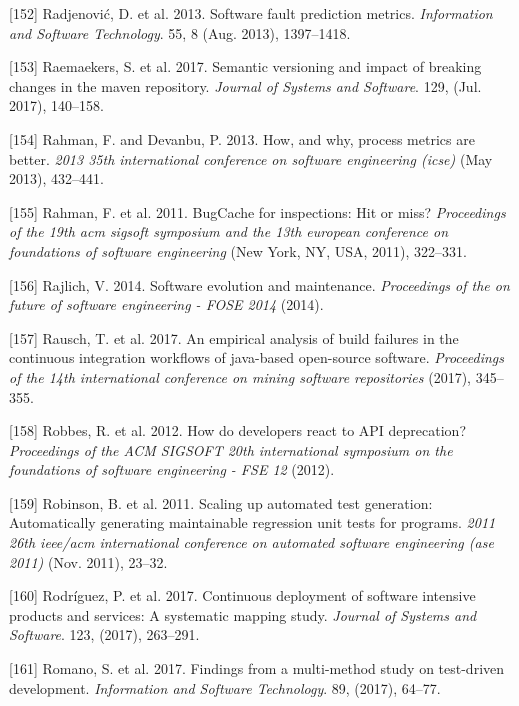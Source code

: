 \documentclass[]{book}
\begin{document}
\hypertarget{ref-Radjenovic2013}{}
{[}152{]} Radjenović, D. et al. 2013. Software fault prediction metrics.
\emph{Information and Software Technology}. 55, 8 (Aug. 2013),
1397--1418.

\hypertarget{ref-Raemaekers2017}{}
{[}153{]} Raemaekers, S. et al. 2017. Semantic versioning and impact of
breaking changes in the maven repository. \emph{Journal of Systems and
Software}. 129, (Jul. 2017), 140--158.

\hypertarget{ref-Rahman2013}{}
{[}154{]} Rahman, F. and Devanbu, P. 2013. How, and why, process metrics
are better. \emph{2013 35th international conference on software
engineering (icse)} (May 2013), 432--441.

\hypertarget{ref-rahman2011}{}
{[}155{]} Rahman, F. et al. 2011. BugCache for inspections: Hit or miss?
\emph{Proceedings of the 19th acm sigsoft symposium and the 13th
european conference on foundations of software engineering} (New York,
NY, USA, 2011), 322--331.

\hypertarget{ref-Rajlich2014}{}
{[}156{]} Rajlich, V. 2014. Software evolution and maintenance.
\emph{Proceedings of the on future of software engineering - FOSE 2014}
(2014).

\hypertarget{ref-rausch2017empirical}{}
{[}157{]} Rausch, T. et al. 2017. An empirical analysis of build
failures in the continuous integration workflows of java-based
open-source software. \emph{Proceedings of the 14th international
conference on mining software repositories} (2017), 345--355.

\hypertarget{ref-Robbes2012}{}
{[}158{]} Robbes, R. et al. 2012. How do developers react to API
deprecation? \emph{Proceedings of the ACM SIGSOFT 20th international
symposium on the foundations of software engineering - FSE 12} (2012).

\hypertarget{ref-robinson2011}{}
{[}159{]} Robinson, B. et al. 2011. Scaling up automated test
generation: Automatically generating maintainable regression unit tests
for programs. \emph{2011 26th ieee/acm international conference on
automated software engineering (ase 2011)} (Nov. 2011), 23--32.

\hypertarget{ref-rodriguez2017a}{}
{[}160{]} Rodríguez, P. et al. 2017. Continuous deployment of software
intensive products and services: A systematic mapping study.
\emph{Journal of Systems and Software}. 123, (2017), 263--291.

\hypertarget{ref-ROMANO201764}{}
{[}161{]} Romano, S. et al. 2017. Findings from a multi-method study on
test-driven development. \emph{Information and Software Technology}. 89,
(2017), 64--77.
\end{document}
